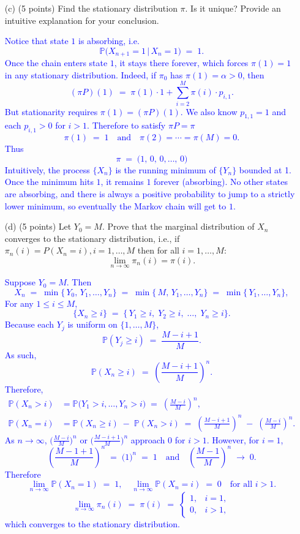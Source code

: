 \documentclass{article}
\begin{document}
\begin{enumerate}
    \item[(c)] (5 points) Find the stationary distribution $\pi$. Is it unique? Provide an intuitive explanation for your conclusion.

    \textcolor{blue}{
Notice that state \(1\) is absorbing, i.e.\
\[
  \mathbb{P}\bigl(X_{n+1} = 1 \,\big\vert\, X_n = 1\bigr)
  \;=\;1.
\]
Once the chain enters state \(1\), it stays there forever, which forces \(\pi(1)=1\) in any stationary distribution.  Indeed, if \(\pi_0\) has \(\pi(1)=\alpha>0\), then
\[
  (\pi P)(1) 
  \;=\; \pi(1) \cdot 1 + \sum_{i=2}^M \pi(i)\cdot p_{i,1}.
\]
But stationarity requires \(\pi(1) = (\pi P)(1)\).  We also know \(p_{1,1}=1\) and each \(p_{i,1}>0\) for \(i>1\). Therefore to satisfy \(\pi P=\pi\)
\[
  \pi(1) \;=\;1
  \quad\text{and}\quad
  \pi(2)=\cdots=\pi(M)=0.
\]
Thus
\[
 \pi \;=\; \bigl(1,\,0,\,0,\dots,\,0\bigr)
\]
Intuitively, the process \(\{X_n\}\) is the running minimum of \(\{Y_n\}\) bounded at 1.  Once the minimum hits \(1\), it remains \(1\) forever (absorbing).  No other states are absorbing, and there is always a positive probability to jump to a strictly lower minimum, so eventually the Markov chain will get to \(1\). 
}

    \item[(d)] (5 points) Let $Y_0 = M$. Prove that the marginal distribution of $X_n$ converges to the stationary distribution, i.e., if $\pi_n(i) = P(X_n = i), i = 1, \ldots, M$ then for all $i = 1, \ldots, M$:
    \[
    \lim_{n \to \infty} \pi_n(i) = \pi(i).
    \]

    \textcolor{blue}{Suppose \(Y_0 = M\).  Then
\[
  X_n \;=\; \min\{\,Y_0,\,Y_1,\dots,Y_n\}
  \;=\; \min\{\,M,\,Y_1,\dots,Y_n\}
  \;=\; \min\{\,Y_1,\dots,Y_n\},
\]
For any \(1 \le i \le M\), 
\[
  \{X_n \ge i\}
  \;=\; \{\,Y_1 \ge i,\;Y_2 \ge i,\;\dots,\;Y_n \ge i\}.
\]
Because each \(Y_j\) is uniform on \(\{1,\dots,M\}\),
\[
  \mathbb{P}(Y_j \ge i) \;=\; \frac{M - i + 1}{M}.
\]
As such,
\[
  \mathbb{P}(X_n \ge i)
  \;=\;
  \left(\frac{M - i + 1}{M}\right)^n.
\]
Therefore,
\[
  \begin{aligned}
     \mathbb{P}(X_n > i) 
     &= 
     \mathbb{P}\bigl(Y_1 > i,\dots,Y_n > i\bigr)
     \;=\;
     \left(\frac{M - i}{M}\right)^n,
     \\[6pt]
     \mathbb{P}(X_n = i)
     &=  
     \mathbb{P}(X_n \ge i)\;-\;\mathbb{P}(X_n > i)
     \;=\;
     \left(\frac{M - i + 1}{M}\right)^n
     \;-\;
     \left(\frac{M - i}{M}\right)^n.
  \end{aligned}
\]
As \(n\to\infty\),
\(\bigl(\frac{M-i}{M}\bigr)^n\) or \(\bigl(\frac{M - i + 1}{M}\bigr)^n\) approach \(0\) for \(i>1\).  However, for \(i=1\),
\[
   \left(\frac{M - 1 + 1}{M}\right)^n
   \;=\; \bigl(1\bigr)^n
   \;=\;1
   \quad\text{and}\quad
   \left(\frac{M - 1}{M}\right)^n 
   \;\to\;0.
\]
Therefore
\[
  \lim_{n\to\infty} \mathbb{P}(X_n=1) 
  \;=\; 1,
  \quad
  \lim_{n\to\infty} \mathbb{P}(X_n=i) 
  \;=\; 0
  \quad\text{for all }i>1.
\]
\[
  \lim_{n\to\infty} \pi_n(i)
  \;=\; \pi(i)
  \;=\;
  \begin{cases}
    1, & i=1,\\
    0, & i>1,
  \end{cases}
\]
which converges to the stationary distribution.
}


\end{enumerate}
\end{document}
